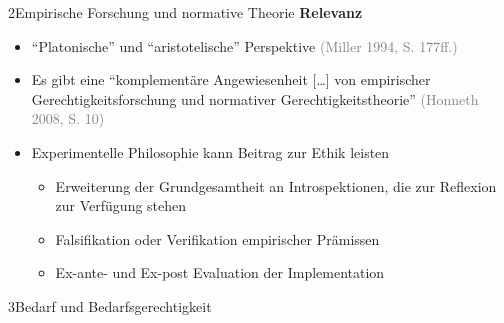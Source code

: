\documentclass[xcolor=table,9pt,aspectratio=169]{beamer}
\begin{document}
\begin{frame}{\vspace*{10mm}2\hspace*{1em}Empirische Forschung und normative Theorie}
\textbf{Relevanz}\\
\medskip
\begin{itemize}
   \item \enquote{Platonische} und \enquote{aristotelische} Perspektive \textcolor{gray}{(Miller 1994, S. 177ff.)}
   \item Es gibt eine \enquote{komplementäre Angewiesenheit [\ldots] von empirischer Gerechtigkeitsforschung und normativer Gerechtigkeitstheorie} \textcolor{gray}{(Honneth 2008, S. 10)}
   \item Experimentelle Philosophie kann Beitrag zur Ethik leisten
   \begin{itemize}
      \item Erweiterung der Grundgesamtheit an Introspektionen, die zur Reflexion zur Verfügung stehen
      \item Falsifikation oder Verifikation empirischer Prämissen
      \item Ex-ante- und Ex-post Evaluation der Implementation
   \end{itemize}
\end{itemize}
\end{frame}


\begin{frame}
\begin{overlayarea}{\textwidth}{0.81\paperheight}{
   \vspace*{11mm}
   \textcolor{uolblue}
   {3\hspace*{1em}Bedarf und Bedarfsgerechtigkeit}
}
\end{overlayarea}
\end{frame}
\end{document}
